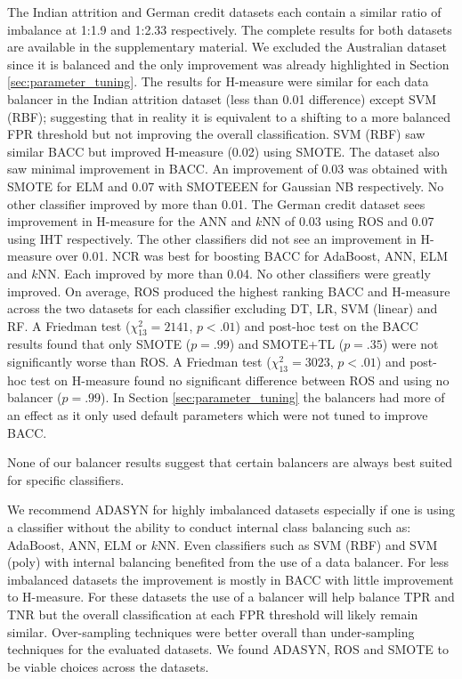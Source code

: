 \documentclass{sig-alternate-05-2015}
\begin{document}
	The Indian attrition and German credit datasets each contain a similar ratio of imbalance at 1:1.9 and 1:2.33 respectively. The complete results for both datasets are available in the supplementary material. We excluded the Australian dataset since it is balanced and the only improvement was already highlighted in Section \ref{sec:parameter_tuning}. The results for H-measure were similar for each data balancer in the Indian attrition dataset (less than 0.01 difference) except SVM (RBF); suggesting that in reality it is equivalent to a shifting to a more balanced FPR threshold but not improving the overall classification. SVM (RBF) saw similar BACC but improved H-measure (0.02) using SMOTE. The dataset also saw minimal improvement in BACC. An improvement of 0.03 was obtained with SMOTE for ELM and 0.07 with SMOTEEEN for Gaussian NB respectively. No other classifier improved by more than 0.01. The German credit dataset sees improvement in H-measure for the ANN and $k$NN of 0.03 using ROS and 0.07 using IHT respectively. The other classifiers did not see an improvement in H-measure over 0.01. NCR was best for boosting BACC for AdaBoost, ANN, ELM and $k$NN. Each improved by more than 0.04. No other classifiers were greatly improved. On average, ROS produced the highest ranking BACC and H-measure across the two datasets for each classifier excluding DT, LR, SVM (linear) and RF. A Friedman test ($\chi^2_{13}=2141$, $p<.01$) and post-hoc test on the BACC results found that only SMOTE ($p=.99$) and SMOTE+TL ($p=.35$) were not significantly worse than ROS. A Friedman test ($\chi^2_{13}=3023$, $p<.01$) and post-hoc test on H-measure found no significant difference between ROS and using no balancer ($p=.99$). In Section \ref{sec:parameter_tuning} the balancers had more of an effect as it only used default parameters which were not tuned to improve BACC. 
	
	None of our balancer results suggest that certain balancers are always best suited for specific classifiers. 
		
	We recommend ADASYN for highly imbalanced datasets especially if one is using a classifier without the ability to conduct internal class balancing such as: AdaBoost, ANN, ELM or $k$NN. Even classifiers such as SVM (RBF) and SVM (poly) with internal balancing benefited from the use of a data balancer. For less imbalanced datasets the improvement is mostly in BACC with little improvement to H-measure. For these datasets the use of a balancer will help balance TPR and TNR but the overall classification at each FPR threshold will likely remain similar. Over-sampling techniques were better overall than under-sampling techniques for the evaluated datasets. We found ADASYN, ROS and SMOTE to be viable choices across the datasets.
	
\end{document}
